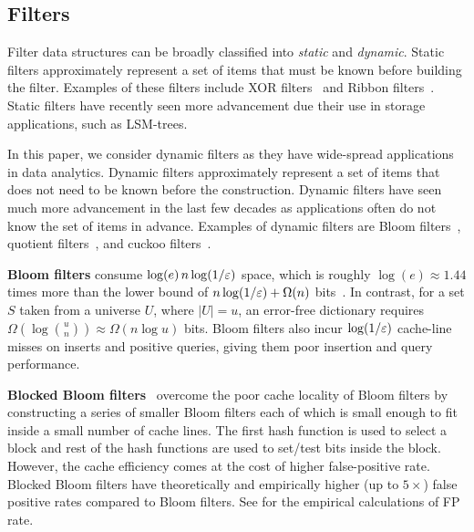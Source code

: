 \subsection{Filters}\label{sec:prelim}

Filter data structures can be broadly classified into \emph{static} and
\emph{dynamic}.  Static filters approximately represent a set of items that must
be known before building the filter. Examples of these filters include XOR
filters~\cite{GrafLe20} and Ribbon filters~\cite{DillingerWalzer21}. Static
filters have recently seen more advancement due their use in storage
applications, such as LSM-trees.


In this paper, we consider dynamic filters as they have wide-spread applications
in data analytics.  Dynamic filters approximately represent a set of items that
does not need to be known before the construction. Dynamic filters have seen
much more advancement in the last few decades as applications often do not know
the set of items in advance. Examples of dynamic filters are Bloom
filters~\cite{Bloom70}, quotient filters~\cite{BenderFaJo12,
PandeyBJP17b,DillingerMa09,PaghPaRa05,EinzigerFr16}, and cuckoo
filters~\cite{FanAnKa14,BreslowJ18}.

\textbf{Bloom filters} consume $\log(e)\, n\log (1/\varepsilon)$ space, which is roughly
$\log(e)\approx 1.44$ times more than the lower bound of $n\log (1/\varepsilon) + \Omega(n)$
bits~\cite{CarterFG78}. In contrast, for a set $S$ taken from a universe $U$,
where $|U|=u$, an error-free dictionary requires $\Omega(\log {u\choose n})
\approx \Omega(n \log u)$ bits. Bloom filters also incur $\log (1/\varepsilon)$ cache-line
misses on inserts and positive queries, giving them poor insertion and query
performance.

\textbf{Blocked Bloom filters}~\cite{putze2007cache} overcome the poor cache
locality of Bloom filters by constructing a series of smaller Bloom filters each
of which is small enough to fit inside a small number of cache lines. The first
hash function is used to select a block and rest of the hash functions are used
to set/test bits inside the block. However, the cache efficiency comes at the
cost of higher false-positive rate. Blocked Bloom filters have theoretically and
empirically higher (up to $5\times$) false positive rates compared to Bloom
filters. See  for the empirical calculations of FP
rate.

